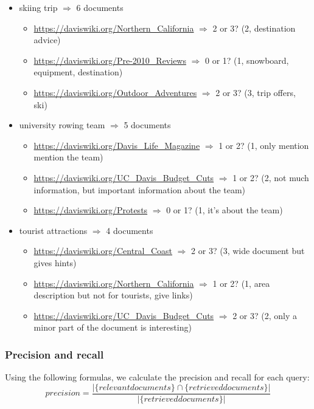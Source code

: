 \begin{itemize}
    \item skiing trip $\Rightarrow$ 6 documents
    \begin{itemize}
        \item \url{https://daviswiki.org/Northern\_California} $\Rightarrow$  2 or 3? (2, destination advice)
        \item \url{https://daviswiki.org/Pre-2010\_Reviews} $\Rightarrow$  0 or 1? (1, snowboard, equipment, destination)
        \item \url{https://daviswiki.org/Outdoor\_Adventures} $\Rightarrow$  2 or 3? (3, trip offers, ski)
    \end{itemize}
    \item university rowing team $\Rightarrow$ 5 documents
    \begin{itemize}
        \item \url{https://daviswiki.org/Davis\_Life\_Magazine} $\Rightarrow$  1 or 2? (1, only mention mention the team)
        \item \url{https://daviswiki.org/UC\_Davis\_Budget\_Cuts} $\Rightarrow$  1 or 2? (2, not much information, but important information about the team)
        \item \url{https://daviswiki.org/Protests} $\Rightarrow$  0 or 1? (1, it's about the team)
    \end{itemize}
    \item tourist attractions $\Rightarrow$ 4 documents
    \begin{itemize}
        \item \url{https://daviswiki.org/Central\_Coast} $\Rightarrow$  2 or 3? (3, wide document but gives hints)
        \item \url{https://daviswiki.org/Northern\_California} $\Rightarrow$  1 or 2? (1, area description but not for tourists, give links)
        \item \url{https://daviswiki.org/UC\_Davis\_Budget\_Cuts} $\Rightarrow$  2 or 3? (2, only a minor part of the document is interesting)
    \end{itemize}
\end{itemize}


\subsubsection{Precision and recall}
Using the following formulas, we calculate the precision and recall for each query:
\begin{equation}
precision = \frac{|\{relevant documents\}\cap\{retrieved documents\}|}{|\{retrieved documents\}|}
\end{equation}


